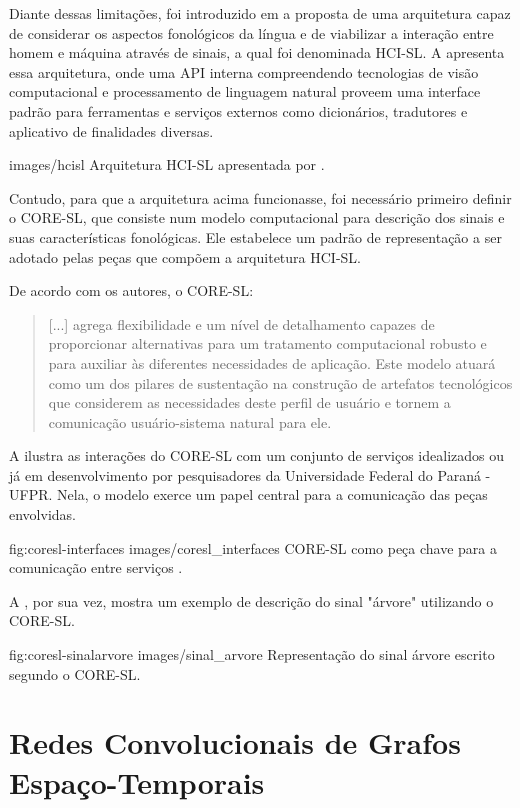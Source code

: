 Diante dessas limitações, foi introduzido em \cite{antunes-hcisl-2011} a proposta de uma arquitetura capaz de considerar os aspectos fonológicos da língua e de viabilizar a interação entre homem e máquina através de sinais, a qual foi denominada HCI-SL. A  apresenta essa arquitetura, onde uma API interna compreendendo tecnologias de visão computacional e processamento de linguagem natural proveem uma interface padrão para ferramentas e serviços externos como dicionários, tradutores e aplicativo de finalidades diversas.

    {images/hcisl}
    {Arquitetura HCI-SL apresentada por \cite{antunes-hcisl-2011}.}

Contudo, para que a arquitetura acima funcionasse, foi necessário primeiro definir o CORE-SL, que consiste num modelo computacional para descrição dos sinais e suas características fonológicas. Ele estabelece um padrão de representação a ser adotado pelas peças que compõem a arquitetura HCI-SL.

De acordo com os autores, o CORE-SL:

\begin{quote}
[...] agrega flexibilidade e um nível de detalhamento capazes de proporcionar alternativas para um tratamento computacional robusto e para auxiliar às diferentes necessidades de aplicação. Este modelo atuará como um dos pilares de sustentação na construção de artefatos tecnológicos que considerem as necessidades deste perfil de usuário e tornem a comunicação usuário-sistema natural para ele. \cite{antunes-2011}
\end{quote}

 A  ilustra as interações do CORE-SL com um conjunto de serviços idealizados ou já em desenvolvimento por pesquisadores da Universidade Federal do Paraná - UFPR. Nela, o modelo exerce um papel central para a comunicação das peças envolvidas.

\image
    {fig:coresl-interfaces}
    {images/coresl_interfaces}
    {CORE-SL como peça chave para a comunicação entre serviços \cite{garcia-2013}.}

A , por sua vez, mostra um exemplo de descrição do sinal "árvore" utilizando o CORE-SL.

\image
    {fig:coresl-sinalarvore}
    {images/sinal_arvore}
    {Representação do sinal árvore escrito segundo o CORE-SL.}
    

\section{Redes Convolucionais de Grafos Espaço-Temporais} %

